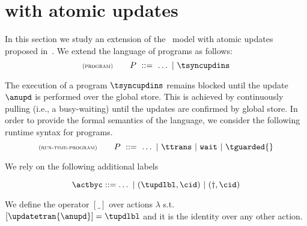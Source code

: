 
\section{{\gsp} with atomic updates}
\label{sec:transactions}

In this section we study an extension of the \gsp\ model with atomic updates proposed in~\cite{DBLP:conf/ecoop/BurckhardtLPF15}. 
We extend the language of programs as follows: 
\[
 \rName{program} 
			 \qquad 
			 \tprogram \ ::=\  \ldots\ |\ \tsyncupdins 
\]

The execution of a program  $\tsyncupdins$ remains blocked until the 
update $\anupd$ is performed over the global store.  This is achieved by continuously pulling (i.e., 
a busy-waiting) until the updates are confirmed by global store. In order to provide 
the formal semantics of the language, we consider the following 
runtime syntax for programs.
\[
 \rName{run-time-program} 
			 \qquad 
			 \tprogram \ ::=\  \ldots\ |\  \ttrans\ |\ \waitcmd \ |\ \tguarded{} 
			 \]

We rely  on the following additional labels
			 
\[  \actbyc ::= \ldots \ |\ (\tupdlbl,\cid)\  |\ (\finishsynctran,\cid)
\]


We define the operator $[\_]$ over actions  $\lambda$ s.t. $[\updatetran{\anupd}] =\tupdlbl$ and it is the identity
over any other action.

